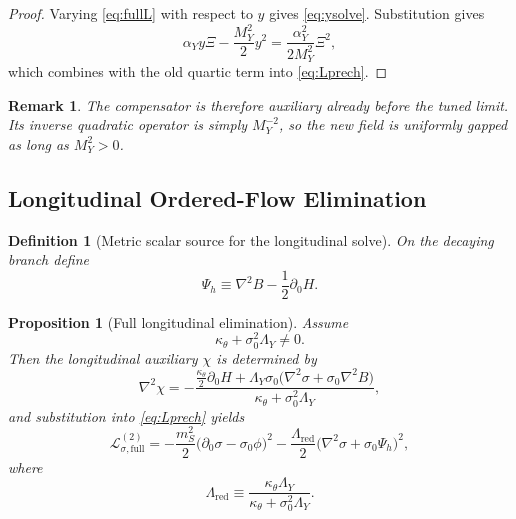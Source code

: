 \documentclass[11pt]{article}
\newtheorem{definition}{Definition}
\newtheorem{proposition}{Proposition}
\newtheorem{remark}{Remark}
\begin{document}
\begin{proof}
Varying \eqref{eq:fullL} with respect to \(y\) gives \eqref{eq:ysolve}. Substitution gives
\[
\alpha_Yy\Xi-\frac{M_Y^2}{2}y^2
=
\frac{\alpha_Y^2}{2M_Y^2}\Xi^2,
\]
which combines with the old quartic term into \eqref{eq:Lprech}.
\end{proof}

\begin{remark}
The compensator is therefore auxiliary already before the tuned limit. Its inverse quadratic operator is simply \(M_Y^{-2}\), so the new field is uniformly gapped as long as \(M_Y^2>0\).
\end{remark}

\subsection{Longitudinal Ordered-Flow Elimination}

\begin{definition}[Metric scalar source for the longitudinal solve]
\label{def:Psih}
On the decaying branch define
\begin{equation}
\Psi_h
\equiv
\nabla^2B-\frac{1}{2}\partial_0H.
\label{eq:Psih}
\end{equation}
\end{definition}

\begin{proposition}[Full longitudinal elimination]
\label{prop:chisolve}
Assume
\begin{equation}
\kappa_\theta+\sigma_0^2\Lambda_Y\neq 0.
\label{eq:denomnonzero}
\end{equation}
Then the longitudinal auxiliary \(\chi\) is determined by
\begin{equation}
\nabla^2\chi
=
-\frac{
\frac{\kappa_\theta}{2}\partial_0H
+\Lambda_Y\sigma_0\bigl(\nabla^2\sigma+\sigma_0\nabla^2B\bigr)
}{
\kappa_\theta+\sigma_0^2\Lambda_Y
},
\label{eq:chisolve}
\end{equation}
and substitution into \eqref{eq:Lprech} yields
\begin{equation}
\mathcal L_{\sigma,\mathrm{full}}^{(2)}
=
-\frac{m_S^2}{2}\bigl(\partial_0\sigma-\sigma_0\phi\bigr)^2
-\frac{\Lambda_{\mathrm{red}}}{2}
\bigl(\nabla^2\sigma+\sigma_0\Psi_h\bigr)^2,
\label{eq:Lsigmafull}
\end{equation}
where
\begin{equation}
\Lambda_{\mathrm{red}}
\equiv
\frac{\kappa_\theta\Lambda_Y}
{\kappa_\theta+\sigma_0^2\Lambda_Y}.
\label{eq:Lambdared}
\end{equation}
\end{proposition}
\end{document}
